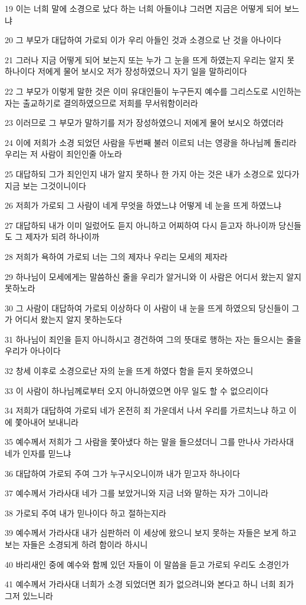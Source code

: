 \par 19 이는 너희 말에 소경으로 났다 하는 너희 아들이냐 그러면 지금은 어떻게 되어 보느냐
\par 20 그 부모가 대답하여 가로되 이가 우리 아들인 것과 소경으로 난 것을 아나이다
\par 21 그러나 지금 어떻게 되어 보는지 또는 누가 그 눈을 뜨게 하였는지 우리는 알지 못하나이다 저에게 물어 보시오 저가 장성하였으니 자기 일을 말하리이다
\par 22 그 부모가 이렇게 말한 것은 이미 유대인들이 누구든지 예수를 그리스도로 시인하는 자는 출교하기로 결의하였으므로 저희를 무서워함이러라
\par 23 이러므로 그 부모가 말하기를 저가 장성하였으니 저에게 물어 보시오 하였더라
\par 24 이에 저희가 소경 되었던 사람을 두번째 불러 이르되 너는 영광을 하나님께 돌리라 우리는 저 사람이 죄인인줄 아노라
\par 25 대답하되 그가 죄인인지 내가 알지 못하나 한 가지 아는 것은 내가 소경으로 있다가 지금 보는 그것이니이다
\par 26 저희가 가로되 그 사람이 네게 무엇을 하였느냐 어떻게 네 눈을 뜨게 하였느냐
\par 27 대답하되 내가 이미 일렀어도 듣지 아니하고 어찌하여 다시 듣고자 하나이까 당신들도 그 제자가 되려 하나이까
\par 28 저희가 욕하여 가로되 너는 그의 제자나 우리는 모세의 제자라
\par 29 하나님이 모세에게는 말씀하신 줄을 우리가 알거니와 이 사람은 어디서 왔는지 알지 못하노라
\par 30 그 사람이 대답하여 가로되 이상하다 이 사람이 내 눈을 뜨게 하였으되 당신들이 그가 어디서 왔는지 알지 못하는도다
\par 31 하나님이 죄인을 듣지 아니하시고 경건하여 그의 뜻대로 행하는 자는 들으시는 줄을 우리가 아나이다
\par 32 창세 이후로 소경으로난 자의 눈을 뜨게 하였다 함을 듣지 못하였으니
\par 33 이 사람이 하나님께로부터 오지 아니하였으면 아무 일도 할 수 없으리이다
\par 34 저희가 대답하여 가로되 네가 온전히 죄 가운데서 나서 우리를 가르치느냐 하고 이에 쫓아내어 보내니라
\par 35 예수께서 저희가 그 사람을 쫓아냈다 하는 말을 들으셨더니 그를 만나사 가라사대 네가 인자를 믿느냐
\par 36 대답하여 가로되 주여 그가 누구시오니이까 내가 믿고자 하나이다
\par 37 예수께서 가라사대 네가 그를 보았거니와 지금 너와 말하는 자가 그이니라
\par 38 가로되 주여 내가 믿나이다 하고 절하는지라
\par 39 예수께서 가라사대 내가 심판하러 이 세상에 왔으니 보지 못하는 자들은 보게 하고 보는 자들은 소경되게 하려 함이라 하시니
\par 40 바리새인 중에 예수와 함께 있던 자들이 이 말씀을 듣고 가로되 우리도 소경인가
\par 41 예수께서 가라사대 너희가 소경 되었더면 죄가 없으려니와 본다고 하니 너희 죄가 그저 있느니라

